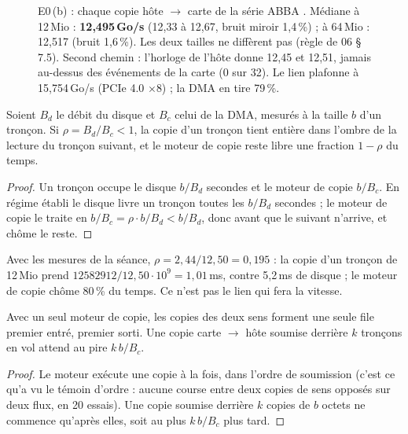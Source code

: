 \begin{figure}[ht]
\centering
\GrapheChmDma
\caption[E0\,(b) : la DMA depuis la mémoire épinglée]{E0\,(b) : chaque copie hôte $\to$ carte de la série ABBA \mes. Médiane à 12\,Mio : \textbf{12,495\,Go/s} (12,33 à 12,67, bruit miroir 1,4\,\%) ; à 64\,Mio : 12,517 (bruit 1,6\,\%). Les deux tailles ne diffèrent pas (règle de 06 § 7.5). Second chemin : l'horloge de l'hôte donne 12,45 et 12,51, jamais au-dessus des événements de la carte (0 sur 32). Le lien plafonne à 15,754\,Go/s (PCIe 4.0 $\times$8) ; la DMA en tire 79\,\%.}
\label{fig:t2c-dma}
\end{figure}

\begin{proposition}\label{prop:t2c-pcie}
Soient $B_d$ le débit du disque et $B_c$ celui de la DMA, mesurés à la taille $b$ d'un tronçon. Si $\rho = B_d / B_c < 1$, la copie d'un tronçon tient entière dans l'ombre de la lecture du tronçon suivant, et le moteur de copie reste libre une fraction $1 - \rho$ du temps.
\end{proposition}

\begin{proof}
Un tronçon occupe le disque $b/B_d$ secondes et le moteur de copie $b/B_c$. En régime établi le disque livre un tronçon toutes les $b/B_d$ secondes ; le moteur de copie le traite en $b/B_c = \rho \cdot b/B_d < b/B_d$, donc avant que le suivant n'arrive, et chôme le reste.
\end{proof}

Avec les mesures de la séance, $\rho = 2{,}44 / 12{,}50 = 0{,}195$ \calc : la copie d'un tronçon de 12\,Mio prend $\num{12582912} / 12{,}50\cdot10^9 = 1{,}01$\,ms, contre 5,2\,ms de disque ; le moteur de copie chôme 80\,\% du temps. Ce n'est pas le lien qui fera la vitesse.

\begin{proposition}\label{prop:t2c-moteur-unique}
Avec un seul moteur de copie, les copies des deux sens forment une seule file premier entré, premier sorti. Une copie carte $\to$ hôte soumise derrière $k$ tronçons en vol attend au pire $k\,b / B_c$.
\end{proposition}

\begin{proof}
Le moteur exécute une copie à la fois, dans l'ordre de soumission (c'est ce qu'a vu le témoin d'ordre : aucune course entre deux copies de sens opposés sur deux flux, en 20 essais). Une copie soumise derrière $k$ copies de $b$ octets ne commence qu'après elles, soit au plus $k\,b/B_c$ plus tard.
\end{proof}

